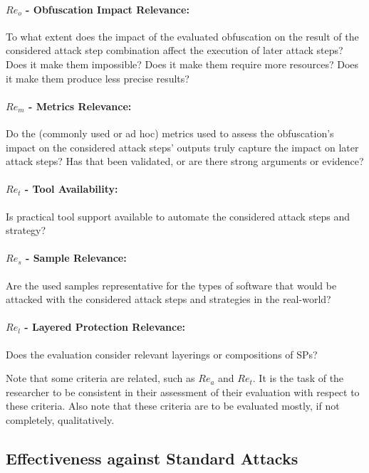 \paragraph{$Re_o$ - Obfuscation Impact Relevance:} To what extent does the impact of the evaluated obfuscation on the result of the considered attack step combination affect the execution of later attack steps? Does it make them impossible? Does it make them require more resources? Does it make them produce less precise results? 

\paragraph{$Re_m$ - Metrics Relevance:} Do the (commonly used or ad hoc) metrics used to assess the obfuscation's impact on the considered attack steps' outputs truly capture the impact on later attack steps? Has that been validated, or are there strong arguments or evidence? 

\paragraph{$Re_t$ - Tool Availability:} Is practical tool support available to automate the considered attack steps and strategy? 

\paragraph{$Re_s$ - Sample Relevance:} Are the used samples representative for the types of software that would be attacked with the considered attack steps and strategies in the real-world?  

\paragraph{$Re_l$ - Layered Protection Relevance:} Does the evaluation consider relevant layerings or compositions of SPs?  

\vspace{0.2cm}

Note that some criteria are related, such as $Re_a$ and $Re_t$. It is the task of the researcher to be consistent in their assessment of their evaluation with respect to these criteria.  Also note that these criteria are to be evaluated mostly, if not completely, qualitatively. 

\subsection{Effectiveness against Standard Attacks}
\label{sec:effectiveness}

